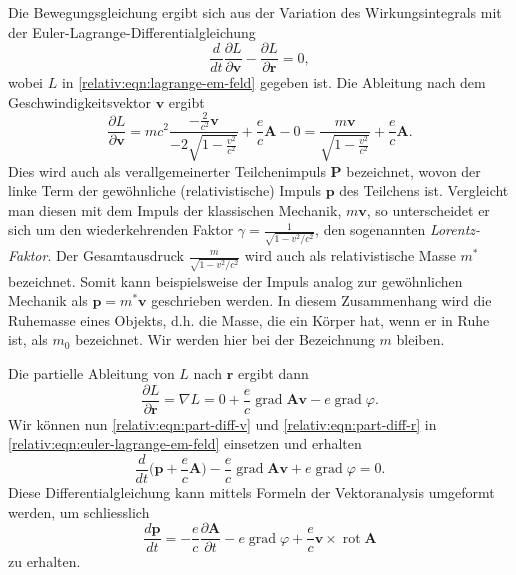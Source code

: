 Die Bewegungsgleichung ergibt sich aus der Variation des Wirkungsintegrals
mit der Euler-Lagrange-Differentialgleichung
\begin{equation}
    \frac{d}{dt} \frac{\partial L}{\partial \bm{v}} - \frac{\partial L}{\partial \bm{r}} = 0,
    \label{relativ:eqn:euler-lagrange-em-feld}
\end{equation}
wobei \(L\) in \eqref{relativ:eqn:lagrange-em-feld} gegeben ist.
Die Ableitung nach dem Geschwindigkeitsvektor \(\bm{v}\) ergibt
\begin{equation}
    \frac{\partial L}{\partial \bm{v}} =
    mc^2 \frac{-\frac{2}{c^2}\bm{v}}{-2\sqrt{1-\frac{v^2}{c^2}}}
    + \frac{e}{c} \bm{A} - 0
    = \frac{m \bm{v}}{\sqrt{1-\frac{v^2}{c^2}}} + \frac{e}{c} \bm{A}.
    \label{relativ:eqn:part-diff-v}
\end{equation}
Dies wird auch als verallgemeinerter Teilchenimpuls \(\bm{P}\) bezeichnet,
wovon der linke Term der gewöhnliche (relativistische) Impuls \(\bm{p}\)
des Teilchens ist.
Vergleicht man diesen mit dem Impuls der klassischen Mechanik, \(m\bm{v}\),
so unterscheidet er sich um den wiederkehrenden Faktor
\(\gamma=\frac{1}{\sqrt{1-v^2/c^2}}\), den sogenannten \emph{Lorentz-Faktor}.
Der Gesamtausdruck \(\frac{m}{\sqrt{1-v^2/c^2}}\) wird auch als
relativistische Masse \(m^*\) bezeichnet. Somit kann beispielsweise der
Impuls analog zur gewöhnlichen Mechanik als
\(\bm{p}=m^*\bm{v}\) geschrieben werden.
In diesem Zusammenhang wird die Ruhemasse eines Objekts, d.h.
die Masse, die ein Körper hat, wenn er in Ruhe ist,
als \(m_0\) bezeichnet.
Wir werden hier bei der Bezeichnung \(m\) bleiben.

Die partielle Ableitung von \(L\) nach \(\bm{r}\) ergibt dann
\begin{equation}
    \frac{\partial L}{\partial \bm{r}} = \nabla L
    = 0 + \frac{e}{c} \operatorname{grad} \bm{Av} - e \operatorname{grad} \varphi.
    \label{relativ:eqn:part-diff-r}
\end{equation}
Wir können nun \eqref{relativ:eqn:part-diff-v} und \eqref{relativ:eqn:part-diff-r}
in \eqref{relativ:eqn:euler-lagrange-em-feld} einsetzen und erhalten
\begin{equation}
    \frac{d}{dt} \biggl(\bm{p} + \frac{e}{c} \bm{A}\biggr)
    - \frac{e}{c} \operatorname{grad} \bm{Av} + e \operatorname{grad} \varphi = 0.
    \label{relativ:eqn:euler-lagrange-em-eingesetzt}
\end{equation}
Diese Differentialgleichung kann mittels Formeln der Vektoranalysis
umgeformt werden, um schliesslich
\begin{equation}
    \frac{d\bm{p}}{dt} = -\frac{e}{c} \frac{\partial\bm{A}}{\partial t}
    - e \operatorname{grad} \varphi +
    \frac{e}{c} \bm{v} \times \operatorname{rot} \bm{A}
    \label{relativ:eqn:euler-lagrange-em-umgeformt}
\end{equation}
zu erhalten.

